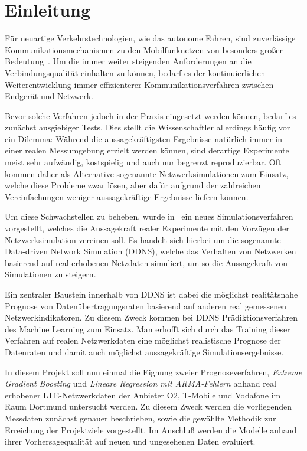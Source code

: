 \section{Einleitung}

F\"ur neuartige Verkehrstechnologien, wie das autonome Fahren, sind zuverl\"assige Kommunikationsmechanismen
zu den Mobilfunknetzen von besonders gro{\ss}er Bedeutung~\cite{IEEE}.
Um die immer weiter steigenden Anforderungen an die Verbindungsqualit\"at einhalten zu k\"onnen, bedarf es
der kontinuierlichen Weiterentwicklung immer effizienterer Kommunikationsverfahren zwischen Endger\"at und Netzwerk.

Bevor solche Verfahren jedoch in der Praxis eingesetzt werden k\"onnen, bedarf es zun\"achst ausgiebiger Tests.
Dies stellt die Wissenschaftler allerdings h\"aufig vor ein Dilemma: W\"ahrend die aussagekr\"aftigsten Ergebnisse nat\"urlich
immer in einer realen Messumgebung erzielt werden k\"onnen, sind derartige Experimente meist sehr aufw\"andig, kostspielig und
auch nur begrenzt reproduzierbar.
Oft kommen daher als Alternative sogenannte Netzwerksimulationen zum Einsatz, welche diese Probleme zwar l\"osen, aber daf\"ur
aufgrund der zahlreichen Vereinfachungen weniger aussagekr\"aftige Ergebnisse liefern k\"onnen.

Um diese Schwachstellen zu beheben, wurde in~\cite{IEEE} ein neues Simulationsverfahren vorgestellt,
welches die Aussagekraft realer Experimente
mit den Vorz\"ugen der Netzwerksimulation vereinen soll. Es handelt sich hierbei um die sogenannte Data-driven Network Simulation (DDNS),
welche das Verhalten von Netzwerken basierend auf real erhobenen Netzdaten simuliert, um so die Aussagekraft von Simulationen zu steigern.

Ein zentraler Baustein innerhalb von DDNS ist dabei die m\"oglichst realit\"atsnahe Prognose von Daten\"ubertragungsraten basierend
auf anderen real gemessenen Netzwerkindikatoren.
Zu diesem Zweck kommen bei DDNS Pr\"adiktionsverfahren des Machine Learning zum Einsatz.
Man erhofft sich durch das Training dieser Verfahren auf realen Netzwerkdaten eine m\"oglichst realistische Prognose der Datenraten und
damit auch m\"oglichst aussagekr\"aftige Simulationsergebnisse.

In diesem Projekt soll nun einmal die Eignung zweier Prognoseverfahren, \textit{Extreme Gradient Boosting} und
\textit{Lineare Regression mit ARMA-Fehlern} anhand real erhobener LTE-Netzwerkdaten der Anbieter O2, T-Mobile und Vodafone
im Raum Dortmund untersucht werden.
Zu diesem Zweck werden die vorliegenden Messdaten zun\"achst genauer beschrieben, sowie die gew\"ahlte Methodik zur Erreichung der
Projektziele vorgestellt. Im Anschlu{\ss} werden die Modelle anhand ihrer Vorhersagequalit\"at auf neuen und ungesehenen Daten evaluiert.
